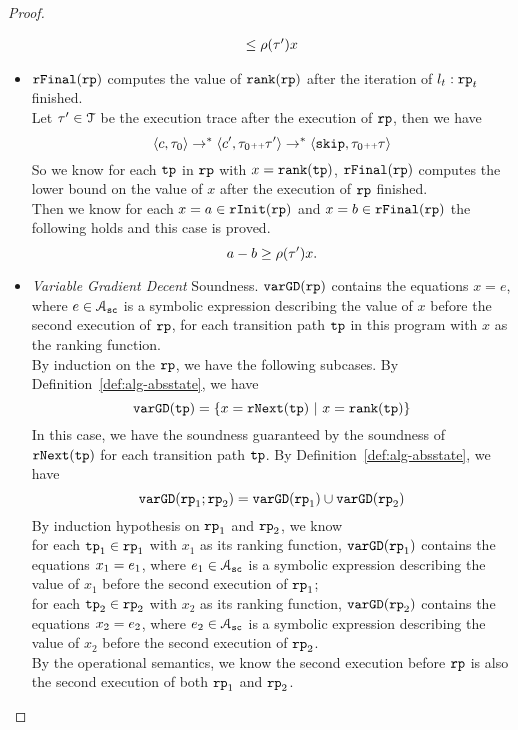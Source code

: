 \begin{proof}
\begin{itemize}
\[\begin{array}{l}
     \leq \rho(\mathtt{\tau}') x
   \end{array}
   \]
 \item $\mathtt{rFinal}(\mathtt{rp})$ computes the value of $\mathtt{rank}(\mathtt{rp})$ after the iteration of $l_t:\mathtt{rp}_t$ finished.
 \\
 Let $\mathtt{\tau}' \in \mathcal{T}$ be the execution trace after the execution of $\mathtt{rp}$,  then we have
 \[
   \langle c, \mathtt{\tau}_0 \rangle \to^* \langle c', \mathtt{\tau}_0 {\scriptscriptstyle ++} \mathtt{\tau}' \rangle \to^* \langle \mathtt{skip}, \mathtt{\tau}_0 {\scriptscriptstyle ++} \mathtt{\tau} \rangle
 \]
So we know for each $\mathtt{tp}$ in $\mathtt{rp}$ with $x = \mathtt{rank}(\mathtt{tp})$,
$\mathtt{rFinal}(\mathtt{rp})$ computes the lower bound on the value of $x$ after the execution of $\mathtt{rp}$ finished.
\\
Then we know for each $ x = a \in \mathtt{rInit}(\mathtt{rp}) $ and $ x = b \in \mathtt{rFinal}(\mathtt{rp}) $
the following holds and this case is proved.
\[
  a - b \geq \rho(\mathtt{\tau}') x.
\]
\item   \emph{Variable Gradient Decent} Soundness.
$\mathtt{varGD}(\mathtt{rp})$ contains the equations $x = e$, where $e \in \mathcal{A}_{\mathtt{sc}}$ is a
  symbolic expression describing the value of $x$ before the second execution of $\mathtt{rp}$,
  for each transition path $\mathtt{tp}$ in this program with $x$ as the ranking function.
\\
 By induction on the $\mathtt{rp}$, we have the following subcases.
 \subcaseL{$\rprog = \tpath$}
 By Definition~\ref{def:alg-absstate}, we have
\[
   \varGD(\tpath) =  \left\{x = \rfnext(\tpath) ~|~ x = \locbound(\tpath) \right\}
\]
In this case, we have the soundness guaranteed by the soundness of $\mathtt{rNext}(\mathtt{tp})$ for each transition path $\mathtt{tp}$.
 By Definition~\ref{def:alg-absstate}, we have
\[
\mathtt{varGD}(\mathtt{rp}_1;\mathtt{rp}_2) =  \mathtt{varGD}(\mathtt{rp}_1) \cup \mathtt{varGD}(\mathtt{rp}_2)
\]
By induction hypothesis on $\mathtt{rp}_1$ and $\mathtt{rp}_2$, we know
\\
for each $\mathtt{tp}_1 \in \mathtt{rp}_1$ with $x_1$ as its ranking function,
$\mathtt{varGD}(\mathtt{rp}_1)$ contains the equations $x_1 = e_1$, where $e_1 \in \mathcal{A}_{\mathtt{sc}}$ is a
symbolic expression describing the value of $x_1$ before the second execution of $\mathtt{rp}_1$;
\\
for each $\mathtt{tp}_2 \in \mathtt{rp}_2$ with $x_2$ as its ranking function,
$\mathtt{varGD}(\mathtt{rp}_2)$ contains the equations $x_2 = e_2$, where $e_2 \in \mathcal{A}_{\mathtt{sc}}$ is a
symbolic expression describing the value of $x_2$ before the second execution of $\mathtt{rp}_2$.
\\
By the operational semantics, we know the second execution before $\mathtt{rp}$ is also the second execution of both $\mathtt{rp}_1$ and $\mathtt{rp}_2$.

\end{itemize}
\end{proof}
